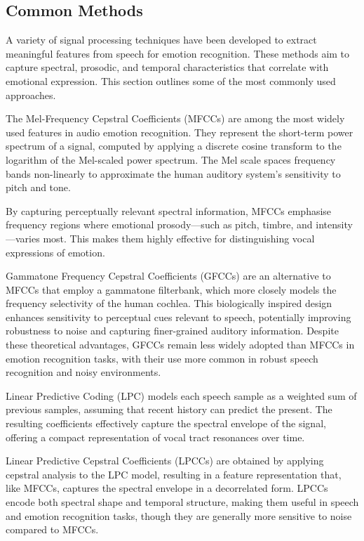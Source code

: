 \subsection{Common Methods}

A variety of signal processing techniques have been developed to extract meaningful features from speech for emotion recognition. These methods aim to capture spectral, prosodic, and temporal characteristics that correlate with emotional expression. This section outlines some of the most commonly used approaches.

The Mel-Frequency Cepstral Coefficients (MFCCs) \cite{Ali2021-ie} are among the most widely used features in audio emotion recognition. They represent the short-term power spectrum of a signal, computed by applying a discrete cosine transform to the logarithm of the Mel-scaled power spectrum. The Mel scale spaces frequency bands non-linearly to approximate the human auditory system's sensitivity to pitch and tone.

By capturing perceptually relevant spectral information, MFCCs emphasise frequency regions where emotional prosody—such as pitch, timbre, and intensity—varies most. This makes them highly effective for distinguishing vocal expressions of emotion.

Gammatone Frequency Cepstral Coefficients (GFCCs) \cite{Shi2016-th} are an alternative to MFCCs that employ a gammatone filterbank, which more closely models the frequency selectivity of the human cochlea. This biologically inspired design enhances sensitivity to perceptual cues relevant to speech, potentially improving robustness to noise and capturing finer-grained auditory information. Despite these theoretical advantages, GFCCs remain less widely adopted than MFCCs in emotion recognition tasks, with their use more common in robust speech recognition and noisy environments.

Linear Predictive Coding (LPC) \cite{OShaughnessy1988-ws} models each speech sample as a weighted sum of previous samples, assuming that recent history can predict the present. The resulting coefficients effectively capture the spectral envelope of the signal, offering a compact representation of vocal tract resonances over time.

Linear Predictive Cepstral Coefficients (LPCCs) \cite{6895780} are obtained by applying cepstral analysis to the LPC model, resulting in a feature representation that, like MFCCs, captures the spectral envelope in a decorrelated form. LPCCs encode both spectral shape and temporal structure, making them useful in speech and emotion recognition tasks, though they are generally more sensitive to noise compared to MFCCs.

